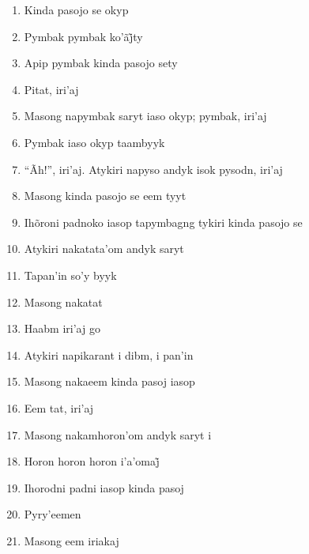 \begin{enumerate}
 \item Kinda pasojo se okyp

 \item Pymbak pymbak ko’ãj̃ty

 \item Apip pymbak kinda pasojo sety

 \item Pitat, iri'aj

 \item Masong napymbak saryt iaso okyp; pymbak, iri'aj

 \item Pymbak iaso okyp taambyyk

 \item ``Ãh!'', iri'aj. Atykiri napyso andyk isok pysodn, iri'aj

 \item Masong kinda pasojo se eem tyyt

 \item Ihõroni padnoko iasop tapymbagng tykiri kinda pasojo se

 \item Atykiri nakatata'om andyk saryt

 \item Tapan'in so'y byyk

 \item Masong nakatat

 \begin{center}\end{center}

 \item Haabm iri'aj go

 \item Atykiri napikarant i dibm, i pan'in

 \item Masong nakaeem kinda pasoj iasop

 \item Eem tat, iri'aj

 \item Masong nakamhoron'om andyk saryt i

 \item Horon horon horon i’a’omaj̃

 \item Ihorodni padni iasop kinda pasoj

 \item Pyry'eemen

 \item Masong eem iriakaj


\end{enumerate}
